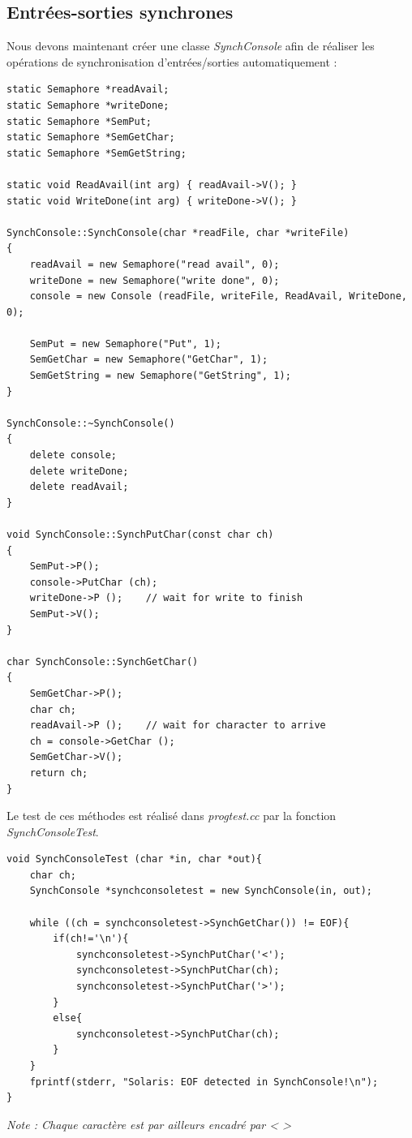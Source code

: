 \documentclass[a4paper,10pt]{article}
\begin{document}
\subsection{Entrées-sorties synchrones}
Nous devons maintenant créer une classe \textit{SynchConsole} afin de réaliser les opérations de synchronisation d'entrées/sorties automatiquement :
\begin{lstlisting}[frame=single]
static Semaphore *readAvail;
static Semaphore *writeDone;
static Semaphore *SemPut;
static Semaphore *SemGetChar;
static Semaphore *SemGetString;

static void ReadAvail(int arg) { readAvail->V(); }
static void WriteDone(int arg) { writeDone->V(); }

SynchConsole::SynchConsole(char *readFile, char *writeFile)
{
	readAvail = new Semaphore("read avail", 0);
	writeDone = new Semaphore("write done", 0);
	console = new Console (readFile, writeFile, ReadAvail, WriteDone, 0);

	SemPut = new Semaphore("Put", 1);
	SemGetChar = new Semaphore("GetChar", 1);
	SemGetString = new Semaphore("GetString", 1);
}

SynchConsole::~SynchConsole()
{
	delete console;
	delete writeDone;
	delete readAvail;
}

void SynchConsole::SynchPutChar(const char ch)
{
	SemPut->P();
	console->PutChar (ch);
	writeDone->P ();	// wait for write to finish
	SemPut->V();
}

char SynchConsole::SynchGetChar()
{
	SemGetChar->P();
	char ch;
	readAvail->P ();	// wait for character to arrive
	ch = console->GetChar ();
	SemGetChar->V();
	return ch;
}
\end{lstlisting}
\newpage
Le test de ces méthodes est réalisé dans \textit{progtest.cc} par la fonction \textit{SynchConsoleTest}.
\begin{lstlisting}[frame=single]
 void SynchConsoleTest (char *in, char *out){
	char ch;
	SynchConsole *synchconsoletest = new SynchConsole(in, out);

	while ((ch = synchconsoletest->SynchGetChar()) != EOF){
		if(ch!='\n'){
			synchconsoletest->SynchPutChar('<');
			synchconsoletest->SynchPutChar(ch);
			synchconsoletest->SynchPutChar('>');
		}
		else{
			synchconsoletest->SynchPutChar(ch);
		}
	}
	fprintf(stderr, "Solaris: EOF detected in SynchConsole!\n");
}
\end{lstlisting}
\textit{Note : Chaque caractère est par ailleurs encadré par < >}
\end{document}
